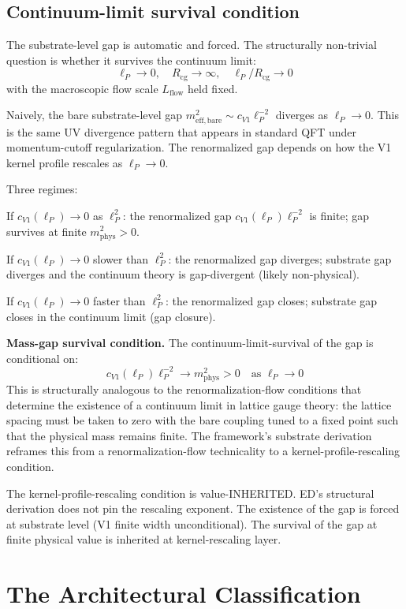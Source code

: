 \documentclass[11pt,a4paper]{article}
\begin{document}
\subsection{Continuum-limit survival condition}

The substrate-level gap is automatic and forced. The structurally non-trivial question is whether it survives the continuum limit:
\[
\ell_P \to 0, \quad R_\mathrm{cg} \to \infty, \quad \ell_P / R_\mathrm{cg} \to 0
\]
with the macroscopic flow scale $L_\mathrm{flow}$ held fixed.

Naively, the bare substrate-level gap $m_\mathrm{eff,bare}^{2} \sim c_{V1} \ell_P^{-2}$ diverges as $\ell_P \to 0$. This is the same UV divergence pattern that appears in standard QFT under momentum-cutoff regularization. The renormalized gap depends on how the V1 kernel profile rescales as $\ell_P \to 0$.

Three regimes:

If $c_{V1}(\ell_P) \to 0$ as $\ell_P^{2}$: the renormalized gap $c_{V1}(\ell_P) \ell_P^{-2}$ is finite; gap survives at finite $m_\mathrm{phys}^{2} > 0$.

If $c_{V1}(\ell_P) \to 0$ slower than $\ell_P^{2}$: the renormalized gap diverges; substrate gap diverges and the continuum theory is gap-divergent (likely non-physical).

If $c_{V1}(\ell_P) \to 0$ faster than $\ell_P^{2}$: the renormalized gap closes; substrate gap closes in the continuum limit (gap closure).

\textbf{Mass-gap survival condition.} The continuum-limit-survival of the gap is conditional on:
\[
c_{V1}(\ell_P) \ell_P^{-2} \to m_\mathrm{phys}^{2} > 0 \quad \text{as } \ell_P \to 0
\]
This is structurally analogous to the renormalization-flow conditions that determine the existence of a continuum limit in lattice gauge theory: the lattice spacing must be taken to zero with the bare coupling tuned to a fixed point such that the physical mass remains finite. The framework's substrate derivation reframes this from a renormalization-flow technicality to a kernel-profile-rescaling condition.

The kernel-profile-rescaling condition is value-INHERITED. ED's structural derivation does not pin the rescaling exponent. The existence of the gap is forced at substrate level (V1 finite width unconditional). The survival of the gap at finite physical value is inherited at kernel-rescaling layer.

\section{The Architectural Classification}
\end{document}
